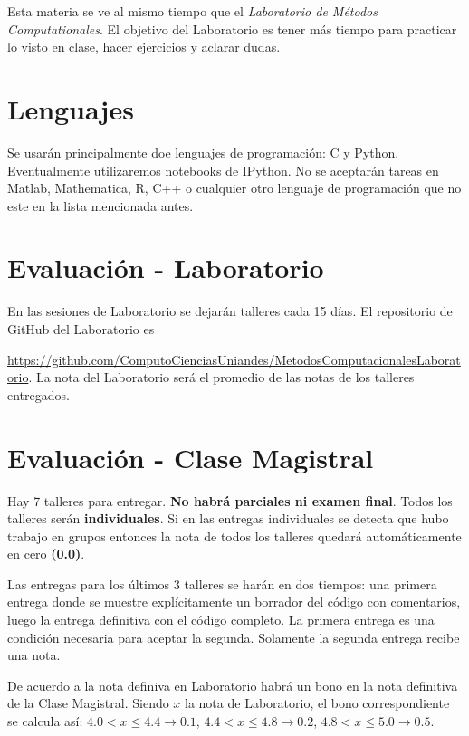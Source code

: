 \documentclass[11pt]{article}
\begin{document}
Esta materia se ve al mismo tiempo que el \emph{Laboratorio de M\'etodos
Computationales}. 
El objetivo del Laboratorio es tener m\'as tiempo para practicar lo
visto en clase, hacer ejercicios y aclarar dudas.

\section*{Lenguajes}
\noindent Se usar\'an principalmente doe lenguajes de programaci\'on:
C y Python. Eventualmente utilizaremos notebooks de IPython.
No se  aceptar\'an tareas en Matlab, Mathematica, R, C++ o cualquier
otro lenguaje  de programaci\'on que no este en la lista mencionada
antes.  

\section*{Evaluaci\'on - Laboratorio}

En las sesiones de Laboratorio se dejar\'an talleres cada 15 d\'ias. El repositorio de GitHub del Laboratorio es

  \url{https://github.com/ComputoCienciasUniandes/MetodosComputacionalesLaboratorio}. La nota del Laboratorio será el promedio de las notas de los talleres entregados.

\section*{Evaluaci\'on - Clase Magistral}

Hay 7 talleres para entregar. \textbf{No habr\'a parciales ni
examen final}. Todos los talleres ser\'an \textbf{individuales}. 
Si en las entregas
individuales se detecta que hubo trabajo en grupos entonces la nota de
todos los talleres quedar\'a autom\'aticamente en cero
\textbf{(0.0)}.  

Las entregas para los \'ultimos 3 talleres se har\'an en dos tiempos:
una primera entrega donde se muestre expl\'icitamente un borrador del
c\'odigo con comentarios, luego la entrega definitiva con el c\'odigo
completo. La primera entrega es una condici\'on necesaria para aceptar
la segunda. Solamente la segunda entrega recibe una nota. 


De acuerdo a la
nota definiva en Laboratorio habr\'a un bono en la nota definitiva de
la Clase Magistral. Siendo $x$ la nota de Laboratorio, el bono correspondiente
se calcula as\'i:
$4.0 < x \leq 4.4 \rightarrow 0.1$, $4.4< x\leq 4.8\rightarrow 0.2$, $4.8<x
\leq 5.0\rightarrow 0.5$.
\end{document}

